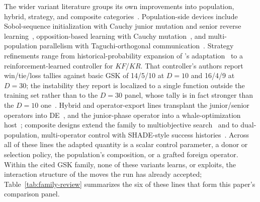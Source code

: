 The wider variant literature groups its own improvements into
population, hybrid, strategy, and composite
categories~\cite{hpe_agsk2025}. Population-side devices include
Sobol-sequence initialization with Cauchy junior mutation and senior
reverse learning~\cite{epd_gsk2024}, opposition-based learning with
Cauchy mutation~\cite{jalali2021opposition}, and multi-population
parallelism with Taguchi-orthogonal communication~\cite{pogsk2023}.
Strategy refinements range from historical-probability expansion of
\agsk{}'s adaptation~\cite{hpe_agsk2025} to a reinforcement-learned
controller for $KF$/$KR$. That controller's authors report win/tie/loss tallies
against basic GSK of 14/5/10 at $D = 10$ and 16/4/9 at $D = 30$; the instability
they report is localized to a single function outside the training set rather than
to the $D = 30$ panel, whose tally is in fact stronger than the $D = 10$
one~\cite{nomer2021gskrl}. %
Hybrid and operator-export lines transplant the junior/senior operators
into DE~\cite{zhong2021gskhho}, and the junior-phase operator into a
whale-optimization host~\cite{liang2024gskwoa}; composite designs extend the family to
multiobjective search~\cite{chalabi2023mogsk} and to dual-population,
multi-operator control with SHADE-style success
histories~\cite{ma2023mgskdpmo,tanabe2013shade}. Across all of these
lines the adapted quantity is a scalar control parameter, a donor or
selection policy, the population's composition, or a grafted foreign
operator. Within the cited GSK family, none of these variants learns,
or exploits, the interaction structure of the moves the run has
already accepted; Table~\ref{tab:family-review} summarizes the six of these
lines that form this paper's comparison panel. %

